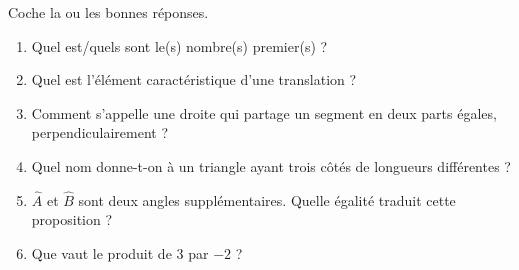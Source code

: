 \documentclass[parskip=half-,DIV=12,twoside=semi, 12pt]{scrartcl}
\newcommand{\abs}[1]{\mid#1\mid}
\newcounter{l}
\begin{document}
\begin{connaitre}[points=6]
    Coche la ou les bonnes réponses.
    \begin{enumerate}
        \item Quel est/quels sont le(s) nombre(s) premier(s) ?
        \item Quel est l'élément caractéristique d'une translation ?
        \item Comment s'appelle une droite qui partage un segment en deux parts égales, perpendiculairement ?
        \item Quel nom donne-t-on à un triangle ayant trois côtés de longueurs différentes ?
              \newpage
        \item \(\widehat{A}\) et \(\widehat{B}\) sont deux angles supplémentaires. Quelle égalité traduit cette proposition ?
        \item Que vaut le produit de 3 par \(-2\) ?
    \end{enumerate}
\end{connaitre}
\end{document}

